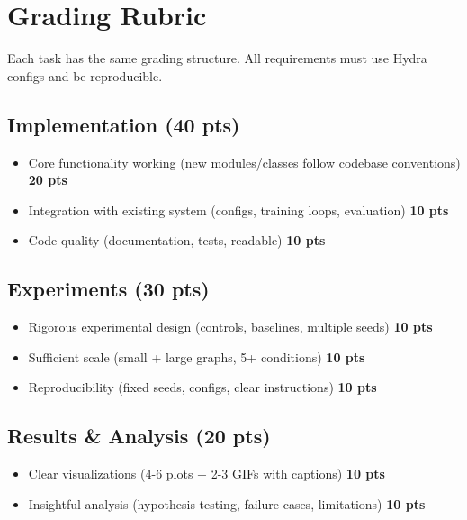 \documentclass[11pt,a4paper]{scrartcl}
\begin{document}
\section*{Grading Rubric}

\begin{tcolorbox}[modern, title=\ttfamily\textbf{Total: 100 points}]
Each task has the same grading structure. All requirements must use Hydra configs and be reproducible.
\end{tcolorbox}

\vspace{0.5em}

\subsection*{Implementation (40 pts)}
\begin{itemize}[leftmargin=1.4em, itemsep=3pt]
    \item Core functionality working (new modules/classes follow codebase conventions) \dotfill \textbf{20 pts}
    \item Integration with existing system (configs, training loops, evaluation) \dotfill \textbf{10 pts}
    \item Code quality (documentation, tests, readable) \dotfill \textbf{10 pts}
\end{itemize}

\subsection*{Experiments (30 pts)}
\begin{itemize}[leftmargin=1.4em, itemsep=3pt]
    \item Rigorous experimental design (controls, baselines, multiple seeds) \dotfill \textbf{10 pts}
    \item Sufficient scale (small + large graphs, 5+ conditions) \dotfill \textbf{10 pts}
    \item Reproducibility (fixed seeds, configs, clear instructions) \dotfill \textbf{10 pts}
\end{itemize}

\subsection*{Results \& Analysis (20 pts)}
\begin{itemize}[leftmargin=1.4em, itemsep=3pt]
    \item Clear visualizations (4-6 plots + 2-3 GIFs with captions) \dotfill \textbf{10 pts}
    \item Insightful analysis (hypothesis testing, failure cases, limitations) \dotfill \textbf{10 pts}
\end{itemize}
\end{document}
